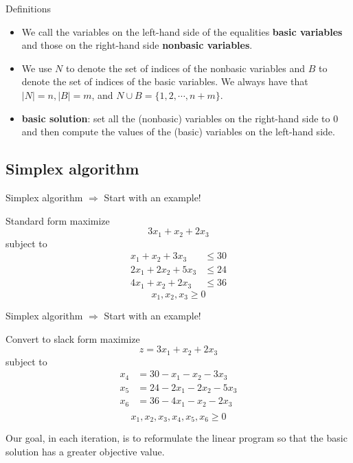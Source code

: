 \begin{frame}{Definitions}

    \begin{itemize}
        \item We call the variables on the left-hand side of
              the equalities \textbf{basic variables} and those on the right-hand side
              \textbf{nonbasic variables}.
        \item We use $N$ to denote the set of indices of the nonbasic variables
              and $B$ to denote the set of indices of the basic variables.
              We always have that $|N|=n,|B|=m$, and $N\cup B=\{1, 2,\cdots, n+m\}$.
        \item \textbf{basic solution}: set all the (nonbasic) variables on the
              right-hand side to $0$ and then compute the values of the (basic) variables
              on the left-hand side.
    \end{itemize}

\end{frame}

\subsection{Simplex algorithm}

\begin{frame}{Simplex algorithm $\Rightarrow$ Start with an example!}

    \begin{block}{Standard form}
        maximize $$3x_1 + x_2 + 2x_3$$
        subject to
        \begin{align*}
            x_1 + x_2 + 3x_3   & \le 30 \\
            2x_1 + 2x_2 + 5x_3 & \le 24 \\
            4x_1 + x_2 + 2x_3  & \le 36
        \end{align*}
        $$x_1, x_2, x_3\ge 0$$
    \end{block}

\end{frame}

\begin{frame}{Simplex algorithm $\Rightarrow$ Start with an example!}

    \begin{block}{Convert to slack form}
        maximize $$z = 3x_1 + x_2 + 2x_3$$
        subject to
        \begin{align*}
            x_4 & = 30 - x_1 - x_2 - 3x_3   \\
            x_5 & = 24 - 2x_1 - 2x_2 - 5x_3 \\
            x_6 & = 36 - 4x_1 - x_2 - 2x_3  \\
        \end{align*}
        $$x_1, x_2, x_3, x_4, x_5, x_6\ge 0$$
    \end{block}

    Our goal, in each iteration, is to reformulate the linear program so that the basic
    solution has a greater objective value.

\end{frame}

